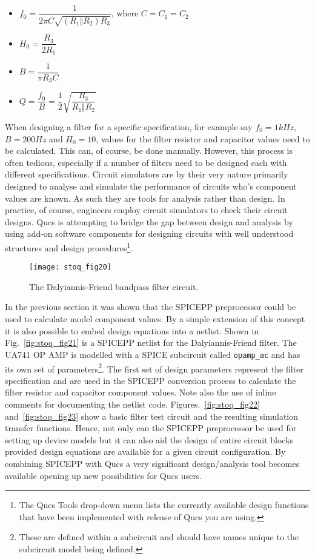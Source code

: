 \begin{itemize}
\item $f_{0}=\dfrac{1}{2 \pi C\sqrt{(R_{1} \Vert R_{2}) R_{3}}}$, where $C = C_{1} = C_{2}$
\item $H_{0} = \dfrac{R_{3}}{2 R_{1}}$
\item $B=\dfrac{1}{\pi R_{3} C}$ 
\item $Q=\dfrac{f_{0}}{B} = \dfrac{1}{2} \sqrt{\dfrac{R_{3}}{R_{1} \Vert R_{2}}}$
\end{itemize}

When designing a filter for a specific specification, for example say $f_{0}=1kHz$, $B=200Hz$ and $H_{0}=10$, values for the filter resistor and capacitor values need to be calculated.  This can, of course, be done manually. However, this process is often tedious, especially if a number of filters need to be designed each with different specifications.  Circuit simulators are by their very nature primarily designed to analyse and simulate the performance of circuits who's component values are known.  As such they are tools for analysis rather than design.  In practice, of course, engineers employ circuit simulators to check their circuit designs.  Qucs is attempting to bridge the gap between design and analysis by using add-on software components for designing circuits with well understood structures and design procedures\footnote{The Qucs Tools drop-down menu lists the currently available design functions that have been implemented with release of Qucs you are using.}.

\begin{figure}
  \centering
  \texttt{[image: stoq\_fig20]}
  \caption{The Dalyiannis-Friend bandpass filter circuit.}
  \label{fig:stoq_fig20}
\end{figure} 

In the previous section it was shown that the SPICEPP preprocessor could be used to calculate model component values.  By a simple extension of this concept it is also possible to embed design equations into a netlist.  Shown in Fig.~\ref{fig:stoq_fig21} is a SPICEPP netlist for the Dalyiannis-Friend filter. The UA741 OP AMP is modelled with a SPICE subcircuit called \verb|opamp_ac| and has its own set of parameters\footnote{These are defined within a subcircuit and should have names unique to the subcircuit model being defined.}. The first set of design parameters represent the filter specification and are used in the SPICEPP conversion process to calculate the filter resistor and capacitor component values.  Note also the use of inline comments for documenting the netlist code. Figures.~\ref{fig:stoq_fig22} and~\ref{fig:stoq_fig23} show a basic filter test circuit and the resulting simulation transfer functions. Hence, not only can the SPICEPP preprocessor be used for setting up device models but it can also aid the design of entire circuit blocks provided design equations are available for a given circuit configuration. By combining SPICEPP with Qucs a very significant design/analysis tool becomes available opening up new possibilities for Qucs users.  


